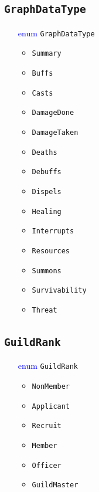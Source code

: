 \documentclass[10pt, a4paper]{memoir}
\numberwithin{equation}{section}
\theoremstyle{plain}
\theoremstyle{defp}
\theoremstyle{dotless}
\theoremstyle{definition}
\theoremstyle{dotless}
\theoremstyle{dotless}
\theoremstyle{defp}
\theoremstyle{defp}
\theoremstyle{be}          %
\theoremstyle{defp}
\newcommand\ttt[1]{\texttt{#1}}
\begin{document}
\subsection{\ttt{GraphDataType}}\label{sec:GraphDataType}
\begin{itemize}[noitemsep,topsep=1pt]
\item[\textcolor{blue}{enum}] \ttt{GraphDataType}
\begin{itemize}[itemsep=1pt,topsep=1pt]
\item \ttt{Summary}
\item \ttt{Buffs}
\item \ttt{Casts}
\item \ttt{DamageDone}
\item \ttt{DamageTaken}
\item \ttt{Deaths}
\item \ttt{Debuffs}
\item \ttt{Dispels}
\item \ttt{Healing}
\item \ttt{Interrupts}
\item \ttt{Resources}
\item \ttt{Summons}
\item \ttt{Survivability}
\item \ttt{Threat}
\end{itemize}
\end{itemize}


\subsection{\ttt{GuildRank}}\label{sec:GuildRank}
\begin{itemize}[noitemsep,topsep=1pt]
\item[\textcolor{blue}{enum}] \ttt{GuildRank}
\begin{itemize}[itemsep=1pt,topsep=1pt]
\item \ttt{NonMember}
\item \ttt{Applicant}
\item \ttt{Recruit}
\item \ttt{Member}
\item \ttt{Officer}
\item \ttt{GuildMaster}
\end{itemize}
\end{itemize}
\end{document}
